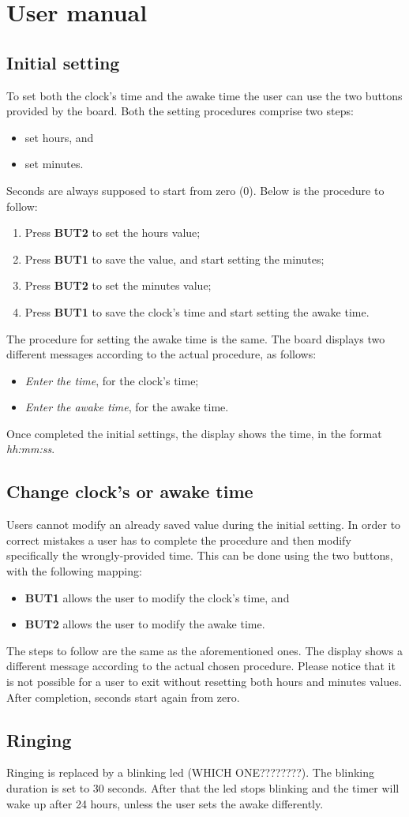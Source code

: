 \section{User manual}
\subsection{Initial setting}
To set both the clock's time and the awake time the user can use the two buttons provided by the board. Both the setting procedures comprise two steps:
\begin{itemize}
	\item set hours, and
	\item set minutes.
\end{itemize}
Seconds are always supposed to start from zero (0). Below is the procedure to follow:
\begin{enumerate}
	\item Press \textbf{BUT2} to set the hours value;
	\item Press \textbf{BUT1} to save the value, and start setting the minutes;
	\item Press \textbf{BUT2} to set the minutes value;
	\item Press \textbf{BUT1} to save the clock's time and start setting the awake time.
\end{enumerate}
The procedure for setting the awake time is the same. The board displays two different messages according to the actual procedure, as follows:
\begin{itemize}
	\item \textit{Enter the time}, for the clock's time;
	\item \textit{Enter the awake time}, for the awake time.
\end{itemize}
Once completed the initial settings, the display shows the time, in the format \textit{hh:mm:ss}. 

\subsection{Change clock's or awake time}
Users cannot modify an already saved value during the initial setting. In order to correct mistakes a user has to complete the procedure and then modify specifically the wrongly-provided time. This can be done using the two buttons, with the following mapping:
\begin{itemize}
	\item \textbf{BUT1} allows the user to modify the clock's time, and
	\item \textbf{BUT2} allows the user to modify the awake time.
\end{itemize}
The steps to follow are the same as the aforementioned ones. The display shows a different message according to the actual chosen procedure. Please notice that it is not possible for a user to exit without resetting both hours and minutes values. After completion, seconds start again from zero. 

\subsection{Ringing}
Ringing is replaced by a blinking led (WHICH ONE????????). The blinking duration is set to 30 seconds. After that the led stops blinking and the timer will wake up after 24 hours, unless the user sets the awake differently.

